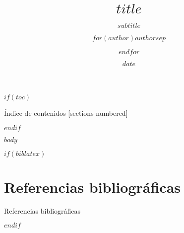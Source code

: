 \documentclass[$if(fontsize)$$fontsize$,$endif$$if(handout)$handout,$endif$$for(classoption)$$classoption$$sep$,$endfor$ block=fill]{beamer}
\title{$title$}
\subtitle{$subtitle$}
\author{$for(author)$$author$$sep$ \and $endfor$}
\institute{$for(institute)$$institute$$sep$ \and $endfor$}
\date{$date$}
\newcounter{cont}
\begin{document}
\maketitle


$if(toc)$
\begin{frame}{Índice de contenidos}
  [sections numbered]
  \tableofcontents[hideallsubsections]
\end{frame}
$endif$


$body$


$if(biblatex)$
\section{Referencias bibliográficas}\label{refs-bib}
\begin{frame}[allowframebreaks]{Referencias bibliográficas}
\printbibliography[heading=none]
\end{frame}
$endif$
\end{document}
